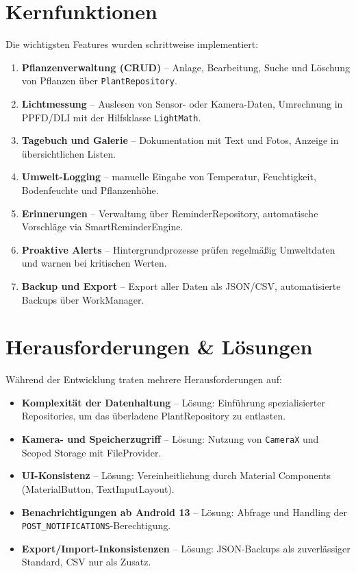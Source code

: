 \documentclass[14pt,a4paper]{report}
\begin{document}
\section{Kernfunktionen}
Die wichtigsten Features wurden schrittweise implementiert:
\begin{enumerate}
    \item \textbf{Pflanzenverwaltung (CRUD)} – Anlage, Bearbeitung, Suche und Löschung von Pflanzen über \texttt{PlantRepository}.
    \item \textbf{Lichtmessung} – Auslesen von Sensor- oder Kamera-Daten, Umrechnung in PPFD/DLI mit der Hilfsklasse \texttt{LightMath}.
    \item \textbf{Tagebuch und Galerie} – Dokumentation mit Text und Fotos, Anzeige in übersichtlichen Listen.
    \item \textbf{Umwelt-Logging} – manuelle Eingabe von Temperatur, Feuchtigkeit, Bodenfeuchte und Pflanzenhöhe.
    \item \textbf{Erinnerungen} – Verwaltung über ReminderRepository, automatische Vorschläge via SmartReminderEngine.
    \item \textbf{Proaktive Alerts} – Hintergrundprozesse prüfen regelmäßig Umweltdaten und warnen bei kritischen Werten.
    \item \textbf{Backup und Export} – Export aller Daten als JSON/CSV, automatisierte Backups über WorkManager.
\end{enumerate}

\section{Herausforderungen \& Lösungen}
Während der Entwicklung traten mehrere Herausforderungen auf:
\begin{itemize}
    \item \textbf{Komplexität der Datenhaltung} – Lösung: Einführung spezialisierter Repositories, um das überladene PlantRepository zu entlasten.
    \item \textbf{Kamera- und Speicherzugriff} – Lösung: Nutzung von \texttt{CameraX} und Scoped Storage mit FileProvider.
    \item \textbf{UI-Konsistenz} – Lösung: Vereinheitlichung durch Material Components (MaterialButton, TextInputLayout).
    \item \textbf{Benachrichtigungen ab Android 13} – Lösung: Abfrage und Handling der \texttt{POST\_NOTIFICATIONS}-Berechtigung.
    \item \textbf{Export/Import-Inkonsistenzen} – Lösung: JSON-Backups als zuverlässiger Standard, CSV nur als Zusatz.
\end{itemize}
\end{document}
